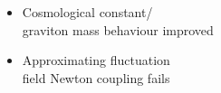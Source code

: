 \documentclass[]{beamer}  %
\begin{document}
\begin{frame}
\begin{columns}[T]
    \hspace{-30pt}
    \begin{column}{.4\textwidth}
      \vspace{10pt}
      \begin{center}
        \begin{itemize}
          \item
            Cosmological constant/\\
            graviton mass behaviour improved
          \item
            Approximating fluctuation\\
            field Newton coupling fails
        \end{itemize}
      \end{center}
    \end{column}
  \end{columns}
\end{frame}


\end{document}
